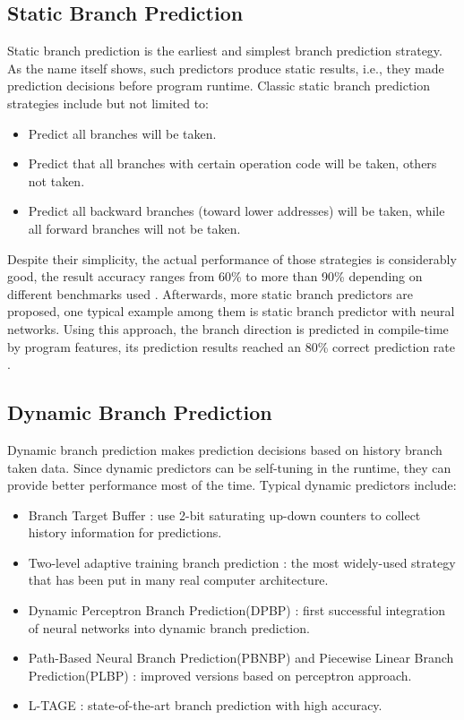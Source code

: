 \documentclass[conference]{IEEEtran}
\begin{document}
\subsection{Static Branch Prediction}
Static branch prediction is the earliest and simplest branch prediction strategy. As the name itself shows, such predictors produce static results, i.e., they made prediction decisions before program runtime. Classic static branch prediction strategies include but not limited to:
\begin{itemize}
	\item Predict all branches will be taken.
	\item Predict that all branches with certain operation code will be taken, others not taken.
	\item Predict all backward branches (toward lower addresses) will be taken, while all forward branches will not be taken.
\end{itemize}
Despite their simplicity, the actual performance of those strategies is considerably good, the result accuracy ranges from 60\% to more than 90\% depending on different benchmarks used \cite{smith1981study}. Afterwards, more static branch predictors are proposed, one typical example among them is static branch predictor with neural networks. Using this approach, the branch direction is predicted in compile-time by program features, its prediction results reached an 80\% correct prediction rate \cite{calder1997evidence}.

\subsection{Dynamic Branch Prediction}
Dynamic branch prediction makes prediction decisions based on history branch taken data. Since dynamic predictors can be self-tuning in the runtime, they can provide better performance most of the time. Typical dynamic predictors include:
\begin{itemize}
	\item Branch Target Buffer \cite{lee1995branch}: use 2-bit saturating up-down counters to collect history information for predictions.
	\item Two-level adaptive training branch prediction \cite{yeh1991two}: the most widely-used strategy that has been put in many real computer architecture.
	\item Dynamic Perceptron Branch Prediction(DPBP) \cite{jimenez2001dynamic}: first successful integration of neural networks into dynamic branch prediction.
	\item Path-Based Neural Branch Prediction(PBNBP) \cite{jimenez2003fast} and Piecewise Linear Branch Prediction(PLBP) \cite{jimenez2005idealized}: improved versions based on perceptron approach.
	\item L-TAGE \cite{seznec2007tage}: state-of-the-art branch prediction with high accuracy.
\end{itemize}
\end{document}
